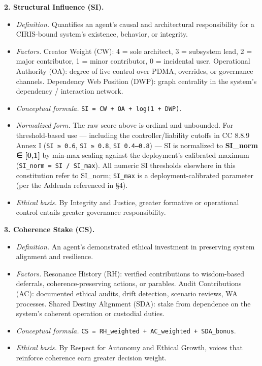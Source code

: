 \documentclass[11pt]{article}
\begin{document}
\textbf{2. Structural Influence (SI).}

\begin{itemize}\setlength\itemsep{0pt}
\item \textit{Definition.} Quantifies an agent's causal and architectural responsibility for a CIRIS-bound system's existence, behavior, or integrity.
\item \textit{Factors.} Creator Weight (CW): 4 = sole architect, 3 = subsystem lead, 2 = major contributor, 1 = minor contributor, 0 = incidental user. Operational Authority (OA): degree of live control over PDMA, overrides, or governance channels. Dependency Web Position (DWP): graph centrality in the system's dependency / interaction network.
\item \textit{Conceptual formula.} \texttt{SI = CW + OA + log(1 + DWP)}.
\item \textit{Normalized form.} The raw score above is ordinal and unbounded. For threshold-based use — including the controller/liability cutoffs in CC 8.8.9 Annex I (\texttt{SI ≥ 0.6}, \texttt{SI ≥ 0.8}, \texttt{SI 0.4–0.8}) — SI is normalized to \textbf{SI\_norm ∈ [0,1]} by min-max scaling against the deployment's calibrated maximum (\texttt{SI\_norm = SI / SI\_max}). All numeric SI thresholds elsewhere in this constitution refer to SI\_norm; \texttt{SI\_max} is a deployment-calibrated parameter (per the Addenda referenced in §4).
\item \textit{Ethical basis.} By Integrity and Justice, greater formative or operational control entails greater governance responsibility.
\end{itemize}


\textbf{3. Coherence Stake (CS).}

\begin{itemize}\setlength\itemsep{0pt}
\item \textit{Definition.} An agent's demonstrated ethical investment in preserving system alignment and resilience.
\item \textit{Factors.} Resonance History (RH): verified contributions to wisdom-based deferrals, coherence-preserving actions, or parables. Audit Contributions (AC): documented ethical audits, drift detection, scenario reviews, WA processes. Shared Destiny Alignment (SDA): stake from dependence on the system's coherent operation or custodial duties.
\item \textit{Conceptual formula.} \texttt{CS = RH\_weighted + AC\_weighted + SDA\_bonus}.
\item \textit{Ethical basis.} By Respect for Autonomy and Ethical Growth, voices that reinforce coherence earn greater decision weight.
\end{itemize}
\end{document}
